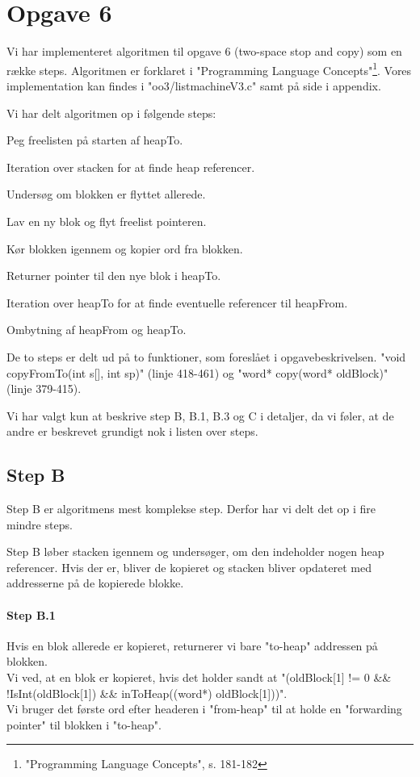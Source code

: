 \section{Opgave 6}
\label{O6}
Vi har implementeret algoritmen til opgave 6 (two-space stop and copy) som en række steps. Algoritmen er forklaret i "Programming Language Concepts"\footnote{"Programming Language Concepts", s. 181-182}. Vores implementation kan findes i "oo3/listmachineV3.c" samt på side \pageref{Code_V3} i appendix.

Vi har delt algoritmen op i følgende steps:
\begin{my_description}
\item[Step A] Peg freelisten på starten af heapTo.
\item[Step B] Iteration over stacken for at finde heap referencer.
	\begin{my_description}
	\item[Step B.1] Undersøg om blokken er flyttet allerede.
	\item[Step B.2] Lav en ny blok og flyt freelist pointeren.
	\item[Step B.3] Kør blokken igennem og kopier ord fra blokken.
	\item[Step B.4] Returner pointer til den nye blok i heapTo.
	\end{my_description}
\item[Step C] Iteration over heapTo for at finde eventuelle referencer til heapFrom.
\item[Step D] Ombytning af heapFrom og heapTo.
\end{my_description}

De to steps er delt ud på to funktioner, som foreslået i opgavebeskrivelsen. "void copyFromTo(int s[], int sp)" (linje 418-461) og "word* copy(word* oldBlock)" (linje 379-415).

Vi har valgt kun at beskrive step B, B.1, B.3 og C i detaljer, da vi føler, at de andre er beskrevet grundigt nok i listen over steps.
\subsection{Step B}
Step B er algoritmens mest komplekse step. Derfor har vi delt det op i fire mindre steps.

Step B løber stacken igennem og undersøger, om den indeholder nogen heap referencer. Hvis der er, bliver de kopieret og stacken bliver opdateret med addresserne på de kopierede blokke.
\paragraph{Step B.1}
Hvis en blok allerede er kopieret, returnerer vi bare "to-heap" addressen på blokken. 
\\Vi ved, at en blok er kopieret, hvis det holder sandt at "(oldBlock[1] != 0 \&\& !IsInt(oldBlock[1]) \&\& inToHeap((word*) oldBlock[1]))". 
\\Vi bruger det første ord efter headeren i "from-heap" til at holde en "forwarding pointer" til blokken i "to-heap".
